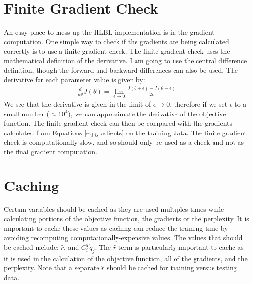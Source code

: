 \section{Finite Gradient Check}
\paragraph{}
An easy place to mess up the HLBL implementation is in the gradient computation. One simple way to check if the gradients are being calculated correctly is to use a finite gradient check. The finite gradient check uses the mathematical definition of the derivative. I am going to use the central difference definition, though the forward and backward differences can also be used. The derivative for each parameter value is given by:
\begin{align}
\frac{d}{d\theta} J(\theta) = \lim_{\epsilon \to 0} \frac{ J({\theta + \epsilon} )- J({\theta - \epsilon}) } {2 \epsilon}
\end{align}
We see that the derivative is given in the limit of $\epsilon \to 0$, therefore if we set $\epsilon$ to a small number ($\approx10^4$), we can approximate the derivative of the objective function. The finite gradient check can then be compared with the gradients calculated from Equations \ref{eq:gradients} on the training data. The finite gradient check is computationally slow, and so should only be used as a check and not as the final gradient computation.

\section{Caching}
\paragraph{}
Certain variables should be cached as they are used multiples times while calculating portions of the objective function, the gradients or the perplexity. It is important to cache these values as caching can reduce the training time by avoiding recomputing computationally-expensive values. The values that should be cached include: $\hat{r}$, and $C_i^T q_j$. The $\hat{r}$ term is particularly important to cache as it is used in the calculation of the objective function, all of the gradients, and the perplexity. Note that a separate $\hat{r}$ should be cached for training versus testing data.

